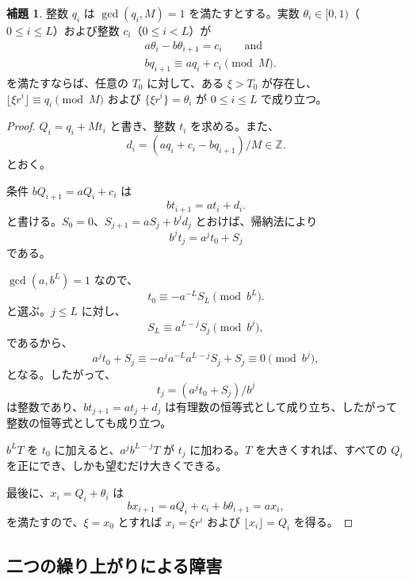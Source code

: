 \documentclass[11pt,reqno]{amsart}
\theoremstyle{definition}
\newtheorem{lemma}[theorem]{補題}
\theoremstyle{definition}
\theoremstyle{remark}
\begin{document}
\begin{samepage}
\begin{lemma}\leavevmode\label{thm:41}
整数 \(q_i\) は \(\gcd(q_i,M)=1\) を満たすとする。実数 \(\theta_i\in[0,1)\)（\(0\le i\le L\)）および整数 \(c_i\)（\(0\le i<L\)）が
\[
\begin{aligned}
&a\theta_i-b\theta_{i+1}=c_i\qquad\text{and}\\
&bq_{i+1}\equiv aq_i+c_i\pmod M.
\end{aligned}
\]
を満たすならば、任意の \(T_0\) に対して、ある \(\xi>T_0\) が存在し、\(\lfloor\xi r^i\rfloor\equiv q_i\pmod M\) および \(\{\xi r^i\}=\theta_i\) が \(0\le i\le L\) で成り立つ。
\label{thm-end:41}
\end{lemma}
\end{samepage}

\begin{proof}\leavevmode\label{proof:41}
\(Q_i=q_i+Mt_i\) と書き、整数 \(t_i\) を求める。また、
\[
d_i=(aq_i+c_i-bq_{i+1})/M\in\mathbb Z.
\]
とおく。

条件 \(bQ_{i+1}=aQ_i+c_i\) は
\[
bt_{i+1}=at_i+d_i.
\]
と書ける。\(S_0=0\)、\(S_{j+1}=aS_j+b^jd_j\) とおけば、帰納法により
\[
b^jt_j=a^jt_0+S_j
\]
である。

\(\gcd(a,b^L)=1\) なので、
\[
t_0\equiv-a^{-L}S_L\pmod{b^L}.
\]
と選ぶ。\(j\le L\) に対し、
\[
S_L\equiv a^{L-j}S_j\pmod{b^j},
\]
であるから、
\[
a^jt_0+S_j\equiv-a^ja^{-L}a^{L-j}S_j+S_j\equiv0\pmod{b^j},
\]
となる。したがって、
\[
t_j=(a^jt_0+S_j)/b^j
\]
は整数であり、\(bt_{j+1}=at_j+d_j\) は有理数の恒等式として成り立ち、したがって整数の恒等式としても成り立つ。

\(b^LT\) を \(t_0\) に加えると、\(a^jb^{L-j}T\) が \(t_j\) に加わる。\(T\) を大きくすれば、すべての \(Q_i\) を正にでき、しかも望むだけ大きくできる。

最後に、\(x_i=Q_i+\theta_i\) は
\[
bx_{i+1}=aQ_i+c_i+b\theta_{i+1}=ax_i,
\]
を満たすので、\(\xi=x_0\) とすれば \(x_i=\xi r^i\) および \(\lfloor x_i\rfloor=Q_i\) を得る。\qedhere
\end{proof}

\subsection{二つの繰り上がりによる障害}\label{sec:8.3}
\end{document}
